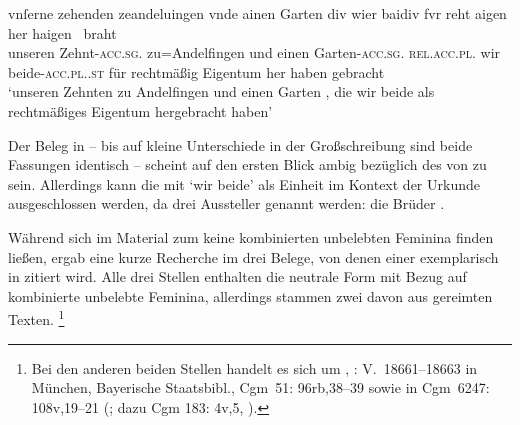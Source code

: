 \begin{exe}
\ex \label{ex:cao_samegend_inan_mm_beidiu}
		\gll vnſerne zehenden zeandeluingen vnde ainen Garten \textelp{} div
				wier baidiv fvr reht aigen her haigen~ braht \\
			unseren Zehnt-\textsc{acc.sg}.\MascI{} zu=Andelfingen und einen
				Garten-\textsc{acc.sg.\MascI} {} \textsc{rel.acc.pl.\NeutI} wir
				beide-\textsc{acc.pl.\NeutI.st} für rechtmäßig Eigentum her
				haben gebracht \\
		\trans `unseren Zehnten zu Andelfingen und einen Garten \textelp{},
			die wir beide als recht\-mäßiges Eigentum hergebracht haben'
			\parencites(Nrn.~1201~AB, Kl.~Heiligkreuztal, Kr.~Biberach,
				1290)[472,10--18]{cao2}

\end{exe}

Der Beleg in  -- bis auf kleine
Unterschiede in der Großschreibung sind beide Fassungen identisch -- scheint
auf den ersten Blick ambig bezüglich des  von
 zu sein. Allerdings kann die  mit 
`wir beide' als Einheit im Kontext der Urkunde ausgeschlossen werden, da drei
Aussteller genannt werden: die Brüder  \autocites(Nrn.~1201~AB)[472,7]{cao2}.

Während sich im Material zum \CAO{} keine kombinierten unbelebten Feminina
finden ließen, ergab eine kurze Recherche im \REM{} drei Belege, von denen
einer exemplarisch in  zitiert wird. Alle drei Stellen
enthalten die neutrale Form  mit Bezug auf kombinierte unbelebte
Feminina, allerdings stammen zwei davon aus gereimten Texten.%
%
	\footnote{Bei den anderen beiden Stellen handelt es sich um
		, : V.~18661--18663 in
		München, Bayerische Staatsbibl., Cgm~51: 96rb,38--39
		\autocites[vgl.][259]{maroldschroeder1969}[M342]{rem} sowie
		 in
		Cgm~6247: 108v,19--21 (\cite[vgl.][M401]{rem}; dazu
		Cgm 183: 4v,5, \cite[vgl.][M405Y]{rem}).}

